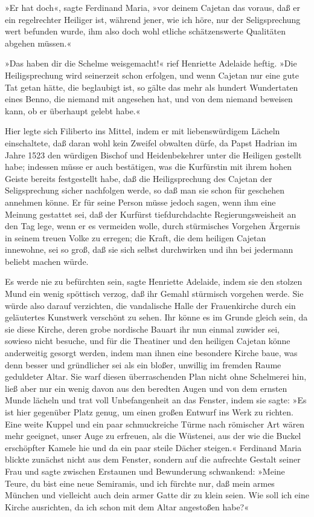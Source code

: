 »Er hat doch«, sagte Ferdinand Maria, »vor deinem Cajetan das
voraus, daß er ein regelrechter Heiliger ist, während jener, wie
ich höre, nur der Seligsprechung wert befunden wurde, ihm also doch
wohl etliche schätzenswerte Qualitäten abgehen müssen.«

»Das haben dir die Schelme weisgemacht!« rief Henriette Adelaide
heftig. »Die Heiligsprechung wird seinerzeit schon \pagenum{[100]}
erfolgen, und wenn Cajetan nur eine gute Tat getan hätte, die
beglaubigt ist, so gälte das mehr als hundert Wundertaten eines
Benno, die niemand mit angesehen hat, und von dem niemand beweisen
kann, ob er überhaupt gelebt habe.«

Hier legte sich Filiberto ins Mittel, indem er mit liebenswürdigem
Lächeln einschaltete, daß daran wohl kein Zweifel obwalten dürfe,
da Papst Hadrian im Jahre 1523 den würdigen Bischof und
Heidenbekehrer unter die Heiligen gestellt habe; indessen müsse er
auch bestätigen, was die Kurfürstin mit ihrem hohen Geiste bereits
festgestellt habe, daß die Heiligsprechung des Cajetan der
Seligsprechung sicher nachfolgen werde, so daß man sie schon für
geschehen annehmen könne. Er für seine Person müsse jedoch sagen,
wenn ihm eine Meinung gestattet sei, daß der Kurfürst
tiefdurchdachte Regierungsweisheit an den Tag lege, wenn er es
vermeiden wolle, durch stürmisches Vorgehen Ärgernis in seinem
treuen Volke zu erregen; die Kraft, die dem heiligen Cajetan
innewohne, sei so groß, daß sie sich selbst durchwirken und ihn bei
jedermann beliebt machen würde.

Es werde nie zu befürchten sein, sagte Henriette Adelaide, indem
sie den stolzen Mund ein wenig spöttisch verzog, daß ihr Gemahl
stürmisch vorgehen werde. Sie würde also darauf verzichten, die
vandalische Halle der Frauenkirche durch ein geläutertes Kunstwerk
verschönt zu sehen. Ihr könne es im Grunde gleich sein, da sie
diese Kirche, deren grobe nordische Bauart ihr nun einmal zuwider
sei, sowieso nicht besuche, und für die Theatiner und den heiligen
Cajetan könne anderweitig gesorgt werden, indem man ihnen eine
besondere Kirche baue, was denn besser und gründlicher sei als ein
bloßer, unwillig im fremden Raume geduldeter Altar. Sie warf diesen
überraschenden Plan nicht ohne \pagenum{[101]} Schelmerei hin, ließ
aber nur ein wenig davon aus den beredten Augen und von dem ernsten
Munde lächeln und trat voll Unbefangenheit an das Fenster, indem
sie sagte: »Es ist hier gegenüber Platz genug, um einen großen
Entwurf ins Werk zu richten. Eine weite Kuppel und ein paar
schmuckreiche Türme nach römischer Art wären mehr geeignet, unser
Auge zu erfreuen, als die Wüstenei, aus der wie die Buckel
erschöpfter Kamele hie und da ein paar steile Dächer steigen.«
Ferdinand Maria blickte zunächst nicht aus dem Fenster, sondern auf
die aufrechte Gestalt seiner Frau und sagte zwischen Erstaunen und
Bewunderung schwankend: »Meine Teure, du bist eine neue Semiramis,
und ich fürchte nur, daß mein armes München und vielleicht auch
dein armer Gatte dir zu klein seien. Wie soll ich eine Kirche
ausrichten, da ich schon mit dem Altar angestoßen habe?«

